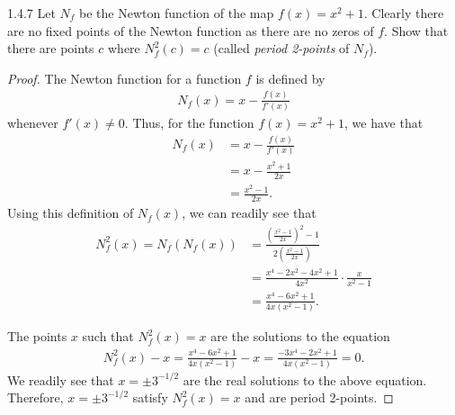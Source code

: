 \begin{problem}{1.4.7}
  Let $N_f$ be the Newton function of the map $f(x) = x^2 + 1$. Clearly there are no
  fixed points of the Newton function as there are no zeros of $f$. Show that there are
  points $c$ where $N_f^2 (c) = c$ (called \emph{period 2-points} of $N_f$).
\end{problem}

\begin{proof}
  The Newton function for a function $f$ is defined by
  \begin{align*}
    N_f(x) = x - \frac{f(x)}{f'(x)}
  \end{align*}
  whenever $f'(x) \neq 0.$ Thus, for the function $f(x) = x^2 + 1$,
  we have that
  \begin{align*}
    N_f(x) &= x - \frac{f(x)}{f'(x)}\\
    &= x - \frac{x^2 + 1}{2x} \\
    &= \frac{x^2 - 1}{2x}.
  \end{align*}
  Using this definition of $N_f(x)$, we can readily see that
  \begin{align*}
    N_f^2(x) = N_f(N_f(x))
    &= \frac{\left(\frac{x^2 - 1}{2x}\right)^2 - 1}{2\left(\frac{x^2 - 1}{2x}\right)} \\
    &= \frac{x^4-2x^2 - 4x^2 +1}{4x^2} \cdot \frac{x}{x^2-1} \\
    &= \frac{x^4 - 6x^2 +1}{4x(x^2 - 1)}.
  \end{align*}

  The points $x$ such that $N_f^2(x) = x$ are the solutions to the equation
  \begin{align*}
    N_f^2(x) - x = \frac{x^4 - 6x^2 +1}{4x(x^2 - 1)} - x = \frac{-3x^4-2x^2+1}{4x(x^2-1)} = 0.
  \end{align*}
  We readily see that $x = \pm 3^{-1/2}$ are the real solutions to the above equation.
  Therefore, $x = \pm 3^{-1/2}$ satisfy $N_f^2(x) = x$ and are period 2-points.
\end{proof}
\newpage
